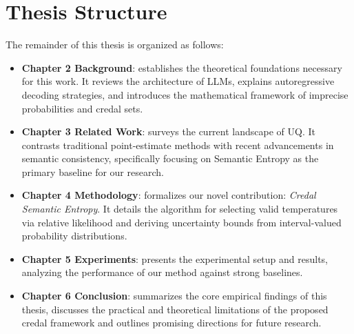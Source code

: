 \section{Thesis Structure}
\label{sec:intro:structure}
The remainder of this thesis is organized as follows: 
\begin{itemize}
	\item \textbf{Chapter 2 Background}:
	    establishes the theoretical foundations 
	    necessary for this work. It reviews the architecture of 
	    LLMs, explains autoregressive decoding 
	    strategies, and introduces the mathematical framework of 
	    imprecise probabilities and credal sets.

	\item \textbf{Chapter 3 Related Work}:
	    surveys the current landscape of UQ. 
	    It contrasts traditional point-estimate 
	    methods with recent advancements in semantic consistency, 
	    specifically focusing on Semantic Entropy as the primary 
	    baseline for our research.

	\item \textbf{Chapter 4 Methodology}:
	    formalizes our novel contribution: 
	    \textit{Credal Semantic Entropy}. It details the algorithm 
	    for selecting valid temperatures via relative likelihood 
	    and deriving uncertainty bounds from 
	    interval-valued probability distributions.

	\item \textbf{Chapter 5 Experiments}:
	    presents the experimental setup and results, 
	    analyzing the performance of our method against strong 
	    baselines.

	\item \textbf{Chapter 6 Conclusion}:
	    summarizes the core empirical findings of this thesis,
	    discusses the practical and theoretical limitations
	    of the proposed credal framework and outlines promising 
	    directions for future research.
\end{itemize}
